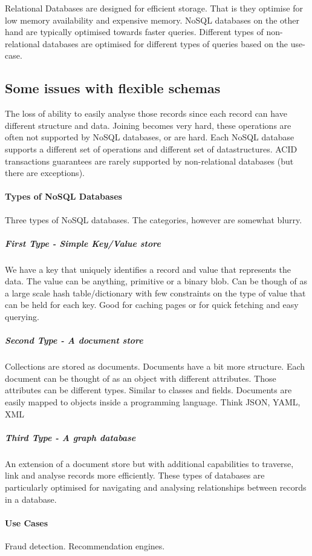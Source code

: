 Relational Databases are designed for efficient storage.
That is they optimise for low memory availability and expensive memory.
NoSQL databases on the other hand are typically optimised towards faster queries.
Different types of non-relational databases are optimised for different types of queries based on the use-case.

\subsection{Some issues with flexible schemas}
The loss of ability to easily analyse those records since each record can have different structure and data.
Joining becomes very hard, these operations are often not supported by NoSQL databases, or are hard.
Each NoSQL database supports a different set of operations and different set of datastructures.
ACID transactions guarantees are rarely supported by non-relational databases (but there are exceptions).

\paragraph{Types of NoSQL Databases}
Three types of NoSQL databases.
The categories, however are somewhat blurry.

\subparagraph{First Type - Simple Key/Value store}
We have a key that uniquely identifies a record and value that represents the data.
The value can be anything, primitive or a binary blob.
Can be though of as a large scale hash table/dictionary with few constraints on the type of value that can be held for each key.
Good for caching pages or for quick fetching and easy querying.

\subparagraph{Second Type - A document store }
Collections are stored as documents.
Documents have a bit more structure.
Each document can be thought of as an object with different attributes.
Those attributes can be different types.
Similar to classes and fields.
Documents are easily mapped to objects inside a programming language.
Think JSON, YAML, XML

\subparagraph{Third Type - A graph database}
An extension of a document store but with additional capabilities to traverse, link and analyse records more efficiently.
These types of databases are particularly optimised for navigating and analysing relationships between records in a database.

\paragraph{Use Cases}
Fraud detection.
Recommendation engines.

